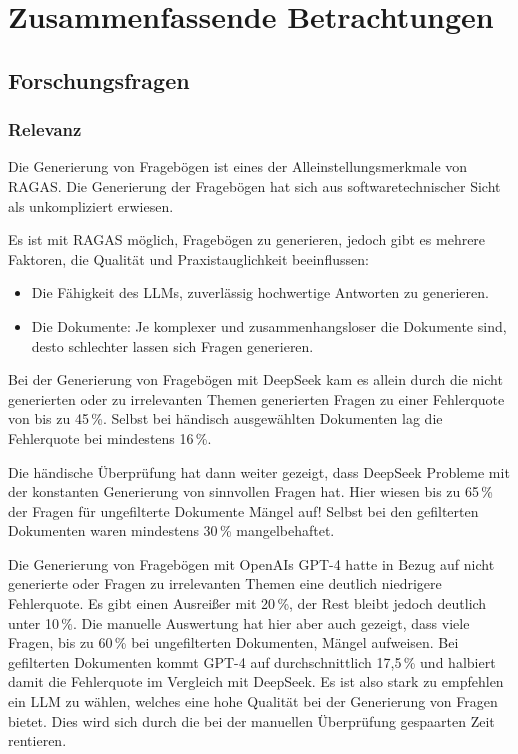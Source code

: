 \chapter{Zusammenfassende Betrachtungen}

\section{Forschungsfragen}
\subsection{Relevanz}
Die Generierung von Fragebögen ist eines der Alleinstellungsmerkmale von RAGAS. Die Generierung der Fragebögen hat sich aus softwaretechnischer Sicht als unkompliziert erwiesen.

Es ist mit RAGAS möglich, Fragebögen zu generieren, jedoch gibt es mehrere Faktoren, die Qualität und Praxistauglichkeit beeinflussen:
\begin{itemize}
    \item Die Fähigkeit des LLMs, zuverlässig hochwertige Antworten zu generieren.
    \item Die Dokumente: Je komplexer und zusammenhangsloser die Dokumente sind, desto schlechter lassen sich Fragen generieren.
\end{itemize}

Bei der Generierung von Fragebögen mit DeepSeek kam es allein durch die nicht generierten oder zu irrelevanten Themen generierten Fragen zu einer Fehlerquote von bis zu 45\,\%.
Selbst bei händisch ausgewählten Dokumenten lag die Fehlerquote bei mindestens 16\,\%.

Die händische Überprüfung hat dann weiter gezeigt, dass DeepSeek Probleme mit der konstanten Generierung von sinnvollen Fragen hat.
Hier wiesen bis zu 65\,\% der Fragen für ungefilterte Dokumente Mängel auf! Selbst bei den gefilterten Dokumenten waren mindestens 30\,\% mangelbehaftet.

Die Generierung von Fragebögen mit OpenAIs GPT-4 hatte in Bezug auf nicht generierte oder Fragen zu irrelevanten Themen eine deutlich niedrigere Fehlerquote.
Es gibt einen Ausreißer mit 20\,\%, der Rest bleibt jedoch deutlich unter 10\,\%.
Die manuelle Auswertung hat hier aber auch gezeigt, dass viele Fragen, bis zu 60\,\% bei ungefilterten Dokumenten, Mängel aufweisen.
Bei gefilterten Dokumenten kommt GPT-4 auf durchschnittlich 17,5\,\% und halbiert damit die Fehlerquote im Vergleich mit DeepSeek.
Es ist also stark zu empfehlen ein LLM zu wählen, welches eine hohe Qualität bei der Generierung von Fragen bietet.
Dies wird sich durch die bei der manuellen Überprüfung gespaarten Zeit rentieren.

